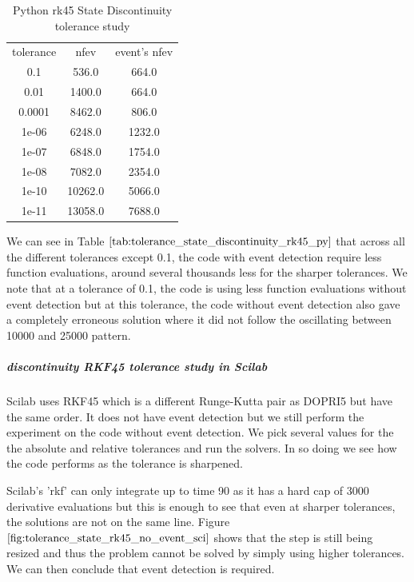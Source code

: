 \begin{table}[h]
\caption {Python rk45 State Discontinuity tolerance study} \label{tab:tolerance_state_discontinuity_rk45_py} 
\begin{center}
\begin{tabular}{ c c c }
tolerance & nfev & event's nfev  \\ 
0.1    & 536.0   & 664.0  \\
0.01   & 1400.0  & 664.0  \\
0.0001 & 8462.0  & 806.0  \\
1e-06  & 6248.0  & 1232.0 \\
1e-07  & 6848.0  & 1754.0 \\
1e-08  & 7082.0  & 2354.0 \\
1e-10  & 10262.0 & 5066.0 \\
1e-11  & 13058.0 & 7688.0 \\
\end{tabular}
\end{center}
\end{table}

We can see in Table $\ref{tab:tolerance_state_discontinuity_rk45_py}$ that across all the different tolerances except 0.1, the code with event detection require less function evaluations, around several thousands less for the sharper tolerances. We note that at a tolerance of 0.1, the code is using less function evaluations without event detection but at this tolerance, the code without event detection also gave a completely erroneous solution where it did not follow the oscillating between 10000 and 25000 pattern. 

\subparagraph{discontinuity RKF45 tolerance study in Scilab}
Scilab uses RKF45 which is a different Runge-Kutta pair as DOPRI5 but have the same order. It does not have event detection but we still perform the experiment on the code without event detection. We pick several values for the the absolute and relative tolerances and run the solvers. In so doing we see how the code performs as the tolerance is sharpened. 

Scilab's 'rkf' can only integrate up to time 90 as it has a hard cap of 3000 derivative evaluations but this is enough to see that even at sharper tolerances, the solutions are not on the same line. Figure $\ref{fig:tolerance_state_rk45_no_event_sci}$ shows that the step is still being resized and thus the problem cannot be solved by simply using higher tolerances. We can then conclude that event detection is required. 

